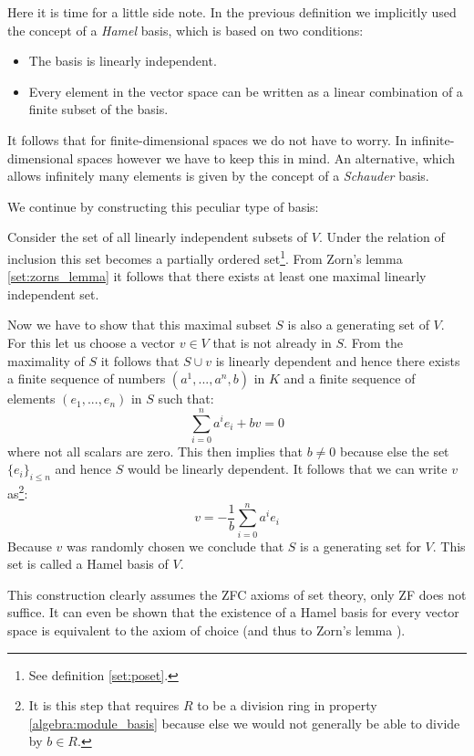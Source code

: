 	\begin{remark}
		Here it is time for a little side note. In the previous definition we implicitly used the concept of a \textit{Hamel} basis, which is based on two conditions:
		\begin{itemize}
			\item The basis is linearly independent.
			\item Every element in the vector space can be written as a linear combination of a finite subset of the basis.
		\end{itemize}
		It follows that for finite-dimensional spaces we do not have to worry. In infinite-dimensional spaces however we have to keep this in mind. An alternative, which allows infinitely many elements is given by the concept of a \textit{Schauder} basis.
	\end{remark}
	
	We continue by constructing this peculiar type of basis:
	\begin{construct}\label{linalgebra:hamel_basis}
		Consider the set of all linearly independent subsets of $V$. Under the relation of inclusion this set becomes a partially ordered set\footnote{See definition \ref{set:poset}.}. From Zorn's lemma \ref{set:zorns_lemma} it follows that there exists at least one maximal linearly independent set.
		
		Now we have to show that this maximal subset $S$ is also a generating set of $V$. For this let us choose a vector $v\in V$ that is not already in $S$. From the maximality of $S$ it follows that $S\cup v$ is linearly dependent and hence there exists a finite sequence of numbers $(a^1, ..., a^n, b)$ in $K$ and a finite sequence of elements $(e_1, ..., e_n)$ in $S$ such that:
		\begin{equation}
			\sum_{i=0}^n a^ie_i + bv = 0
		\end{equation}
		where not all scalars are zero. This then implies that $b\neq0$ because else the set $\{e_i\}_{i\leq n}$ and hence $S$ would be linearly dependent. It follows that we can write $v$ as\footnote{It is this step that requires $R$ to be a division ring in property \ref{algebra:module_basis} because else we would not generally be able to divide by $b\in R$.}:
		\begin{equation}
			v = -\frac{1}{b}\sum_{i=0}^na^ie_i
		\end{equation}
		Because $v$ was randomly chosen we conclude that $S$ is a generating set for $V$. This set is called a Hamel basis of $V$.
	\end{construct}
	\begin{remark*}
		This construction clearly assumes the ZFC axioms of set theory, only ZF does not suffice. It can even be shown that the existence of a Hamel basis for every vector space is equivalent to the axiom of choice (and thus to Zorn's lemma ).
	\end{remark*}
    
